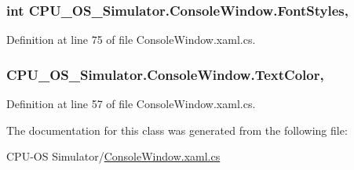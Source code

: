 \subsubsection[{Font\+Styles}]{\setlength{\rightskip}{0pt plus 5cm}int C\+P\+U\+\_\+\+O\+S\+\_\+\+Simulator.\+Console\+Window.\+Font\+Styles\hspace{0.3cm}{\ttfamily [get]}, {\ttfamily [set]}}\label{class_c_p_u___o_s___simulator_1_1_console_window_a1984ceb7ee007669685c8de6c4554b06}


Definition at line 75 of file Console\+Window.\+xaml.\+cs.

\hypertarget{class_c_p_u___o_s___simulator_1_1_console_window_a9ed1d4cf5229b50e355092d33ea0c3e6}{}
\subsubsection[{Text\+Color}]{ C\+P\+U\+\_\+\+O\+S\+\_\+\+Simulator.\+Console\+Window.\+Text\+Color\hspace{0.3cm}{\ttfamily [get]}, {\ttfamily [set]}}\label{class_c_p_u___o_s___simulator_1_1_console_window_a9ed1d4cf5229b50e355092d33ea0c3e6}


Definition at line 57 of file Console\+Window.\+xaml.\+cs.



The documentation for this class was generated from the following file\+:\begin{DoxyCompactItemize}
\item 
C\+P\+U-\/\+O\+S Simulator/\hyperlink{_console_window_8xaml_8cs}{Console\+Window.\+xaml.\+cs}\end{DoxyCompactItemize}
